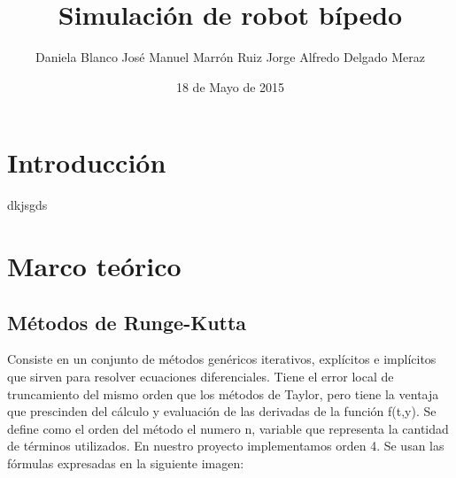 \documentclass[10pt]{article}
\title{Simulación de robot bípedo}
\date{18 de Mayo de 2015}
\author{
	Daniela Blanco
	José Manuel Marrón Ruiz
	Jorge Alfredo Delgado Meraz
}
\begin{document}
\maketitle
\section{Introducción}
dkjsgds
\section{Marco teórico}
\subsection{Métodos de Runge-Kutta}
Consiste en un conjunto de métodos genéricos iterativos, explícitos e implícitos que sirven para resolver ecuaciones diferenciales. Tiene el error local de truncamiento del mismo orden que los métodos de Taylor, pero tiene la ventaja que prescinden del cálculo y evaluación de las derivadas de la función f(t,y). Se define como el orden del método el numero n, variable que representa la cantidad de términos utilizados. En nuestro proyecto implementamos orden 4. Se usan las fórmulas expresadas en la siguiente imagen:
\begin{center}
\end{center}
\end{document}
